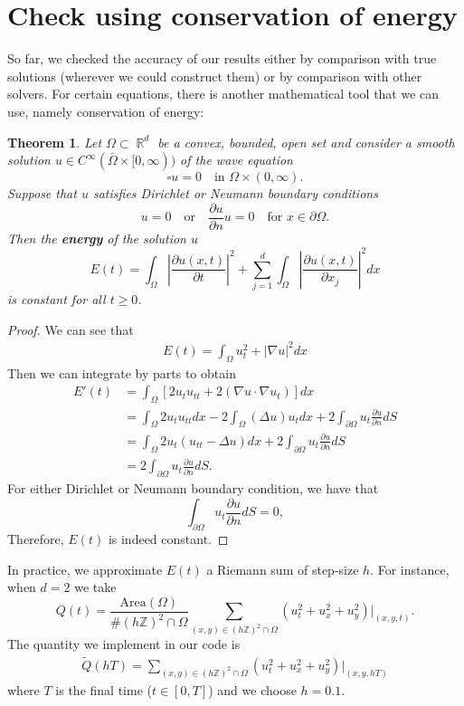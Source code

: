 \documentclass{article} %
\theoremstyle{plain}
\newtheorem{theorem}{Theorem}[section]
\theoremstyle{definition}
\theoremstyle{remark}
\DeclareMathOperator*{\R}{\mathbb{R}}
\newcommand{\p}{\partial}
\begin{document}
\section{Check using conservation of energy}\label{sec:conservation_energy}
So far, we checked the accuracy of our results either by comparison with true solutions (wherever we could construct them) or by comparison with other solvers. For certain equations, there is another mathematical tool that we can use, namely conservation of energy:
\begin{theorem}\label{thm:energy_conservation}
    Let $\Omega\subset\R^d$ be a convex, bounded, open set and consider a smooth solution $u\in C^\infty(\bar\Omega\times[0,\infty))$ of the wave equation
    $$
    \square u=0\quad\text{in }\Omega\times(0,\infty).
    $$
    Suppose that $u$ satisfies Dirichlet or Neumann boundary conditions
    $$
    u=0\quad\text{or}\quad\dfrac{\partial u}{\partial n}u=0\quad\text{for }x\in\partial\Omega.
    $$
    Then the \textbf{energy} of the solution $u$
    $$
E(t)=\int_{\Omega}\left|\frac{\partial u(x, t)}{\partial t}\right|^2+\sum_{j=1}^d \int_{\Omega}\left|\frac{\partial u(x, t)}{\partial x_j}\right|^2 d x
$$
is constant for all $t\geq0$.
\end{theorem}
\begin{proof}
We can see that
\begin{align*}
    E(t)=\int_{\Omega}u_t^2+|\nabla u|^2dx
\end{align*}
Then we can integrate by parts to obtain
\begin{align*}
    E'(t)&=\int_{\Omega}\left[2u_tu_{tt}+2(\nabla u\cdot \nabla u_t)\right]dx\\
    &=\int_{\Omega}2u_tu_{tt}dx-2\int_{\Omega}(\Delta u)u_t dx + 2\int_{\p\Omega}u_t\frac{\p u}{\p n}dS\\
    &=\int_{\Omega}2u_t(u_{tt}-\Delta u)dx+ 2\int_{\p\Omega}u_t\frac{\p u}{\p n}dS\\
    &=2\int_{\p\Omega}u_t\frac{\p u}{\p n}dS.
\end{align*}
For either Dirichlet or Neumann boundary condition, we have that 
\[
\int_{\p\Omega}u_t\frac{\p u}{\p n}dS=0,
\]
Therefore, \(E(t)\) is indeed constant.
\end{proof}
In practice, we approximate $E(t)$ a Riemann sum of step-size $h$. For instance, when $d=2$ we take
\[
Q(t)=\frac{\text{Area}(\Omega)}{\# (h\mathbb Z)^2\cap\Omega}\sum_{(x,y)\in (h\mathbb Z)^2\cap\Omega}(u_t^2+u_x^2+u_y^2)\big|_{(x,y,t)}.
\]
The quantity we implement in our code is
\begin{align}\label{eq:energy_integral}
\tilde Q(hT)=\sum_{(x,y)\in (h\mathbb Z)^2\cap\Omega}(u_t^2+u_x^2+u_y^2)\big|_{(x,y,hT)}
\end{align}
where $T$ is the final time ($t\in[0,T]$) and we choose $h=0
.1$.
\end{document}
